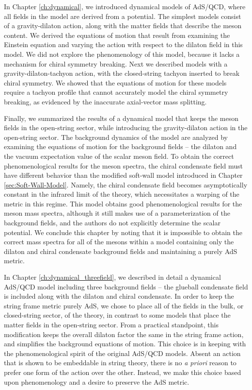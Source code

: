 In Chapter \ref{ch:dynamical}, we introduced dynamical models of AdS/QCD, where all fields in the model are derived from a potential.
The simplest models consist of a gravity-dilaton action, along with the matter fields that describe the meson content. 
We derived the equations of motion that result from examining the Einstein equation and varying the action with respect to the dilaton field in this model. 
We did not explore the phenomenology of this model, because it lacks a mechanism for chiral symmetry breaking.
Next we described models with a gravity-dilaton-tachyon action, with the closed-string tachyon inserted to break chiral symmetry.
We showed that the equations of motion for these models require a tachyon profile that cannot accurately model the chiral symmetry breaking, as evidenced by the inaccurate axial-vector mass splitting.

Finally, we summarized the results of a dynamical model that keeps the meson fields in the open-string sector, while introducing the gravity-dilaton action in the open-string sector. 
The background dynamics of the model are analyzed by examining the equations of motion for the background fields -- the dilaton and the vacuum expectation value of the scalar meson field.
To obtain the correct phenomenological results for the meson spectra, the chiral condensate field must have different behavior than the modified soft-wall model introduced in Chapter \ref{sec:Soft-Wall-Model}.
Namely, the chiral condensate field becomes asymptotically constant in the infrared limit of the theory, which necessitates a warping of the metric in this regime.
This model obtains good phenomenological results for the meson mass spectra, although it still makes use of a parameterization of the background fields, and the authors do not explicitly determine the scalar potential.
We conclude this chapter by noting that it is impossible to obtain the correct mass spectra for all of the mesons within a model containing only the dilaton and chiral condensate background fields and maintaining a purely AdS metric.

In Chapter \ref{ch:dynamical_threefield}, we described in detail a dynamical AdS/QCD model including three background fields -- the glueball condensate field is included along with the dilaton and chiral condensate.
In order to keep the string frame metric purely AdS, we chose to place all of the fields in the bulk, or closed-string sector, of the theory, in contrast to some models that place the matter fields in the open-string sector.
From a practical standpoint, this modification keeps the overall dilaton factor the same in the string frame action, and simplifies the background equations of motion.
This choice is in keeping with the phenomenological spirit of the original AdS/QCD models.
Absent an action that is shown to be embeddable in string theory, there is no \emph{a priori} reason to prefer one form of the action over the other.
Instead, we make this choice based upon phenomenology and a desire to preserve the AdS metric.

